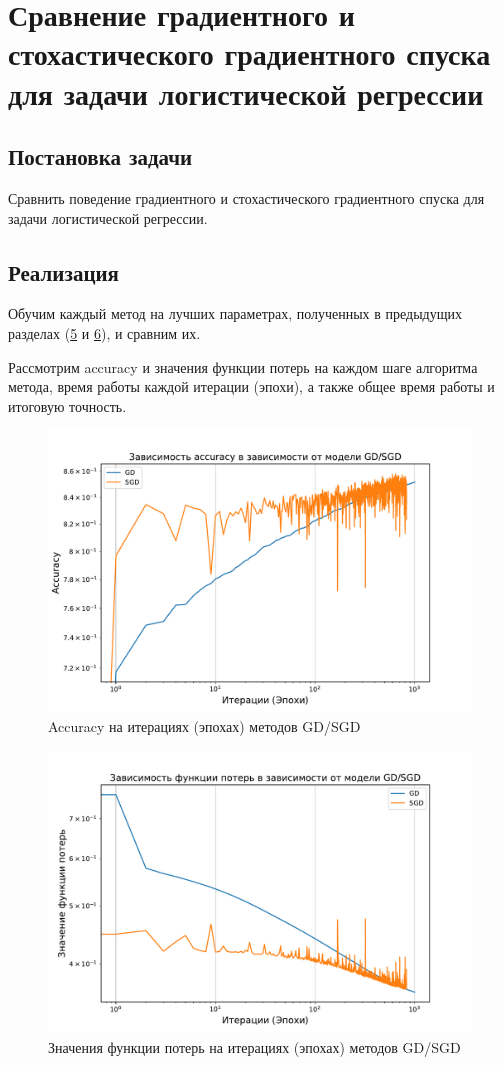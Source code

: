 \documentclass[14pt]{extarticle}
\begin{document}
\section{Сравнение градиентного и стохастического градиентного спуска для задачи логистической регрессии}

\subsection{Постановка задачи}

Сравнить поведение градиентного и стохастического градиентного спуска для задачи логистической регрессии.

\subsection{Реализация}

Обучим каждый метод на лучших параметрах, полученных в предыдущих разделах (\hyperref[sec:section5]{5} и \hyperref[sec:section5]{6}), и сравним их.

Рассмотрим accuracy и значения функции потерь на каждом шаге алгоритма метода, время работы каждой итерации (эпохи), а также общее время работы и итоговую точность.

\begin{figure}[H]
    \centering
    \includegraphics[width=0.7\linewidth]
    {exp_6_acc.pdf}
    \caption{Accuracy на итерациях (эпохах) методов GD/SGD}
    \label{fig:exp_6_acc}
\end{figure}

\begin{figure}[H]
    \centering
    \includegraphics[width=0.7\linewidth]
    {exp_6_loss.pdf}
    \caption{Значения функции потерь на итерациях (эпохах) методов GD/SGD}
    \label{fig:exp_6_loss}
\end{figure}
\end{document}
